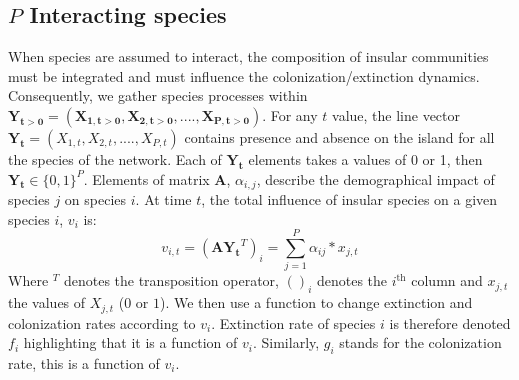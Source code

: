 \subsection{$P$ Interacting species}

When species are assumed to interact, the composition of insular communities must be integrated and must influence the colonization/extinction dynamics. Consequently, we gather species processes within $\mathbf{Y_{t>0}}=(\mathbf{X_{1,t>0}}, \mathbf{X_{2,t>0}}, ...., \mathbf{X_{P,t>0}})$. For any $t$ value, the line vector $\mathbf{\mathbf{Y_t}}=(X_{1,t}, X_{2,t}, ...., X_{P,t})$ contains presence and absence on the island for all the species of the network. Each of $\mathbf{\mathbf{Y_t}}$ elements takes a values of 0 or 1, then $\mathbf{\mathbf{Y_t}}\in \{0,1\}^P$.
Elements of matrix $\mathbf{A}$, $\alpha_{i,j}$, describe the demographical impact of species $j$ on species $i$. At time $t$, the total influence of insular species on a given species $i$, $v_i$ is:
\begin{equation}
 \label{eqAnn2_7} v_{i,t}=(\mathbf{A}\mathbf{\mathbf{Y_t}}^T)_i=\sum_{j=1}^P\alpha_{ij}*x_{j,t}
\end{equation}
Where $^T$ denotes the transposition operator, $()_i$ denotes the $i^{\text{th}}$ column and $x_{j,t}$ the values of $X_{j,t}$ ($0$ or $1$). We then use a function to change extinction and colonization rates according to $v_i$. Extinction rate of species $i$ is therefore denoted $f_i$ highlighting that it is a function of $v_i$. Similarly, $g_i$ stands for the colonization rate, this is a function of $v_i$.

